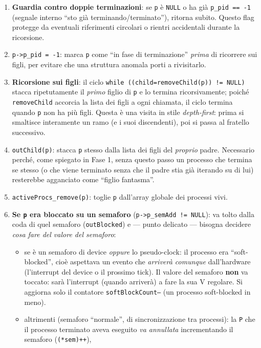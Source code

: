 \documentclass[11pt,a4paper]{article}
\newcommand{\code}[1]{\texttt{#1}}
\begin{document}
\begin{enumerate}
\item \textbf{Guardia contro doppie terminazioni}: se \code{p} è
  \code{NULL} o ha già \code{p\_pid == -1} (segnale interno ``sto già
  terminando/terminato''), ritorna subito. Questo flag protegge da eventuali
  riferimenti circolari o rientri accidentali durante la ricorsione.
\item \code{p->p\_pid = -1}: marca \code{p} come ``in fase di
  terminazione'' \emph{prima} di ricorrere sui figli, per evitare che una
  struttura anomala porti a rivisitarlo.
\item \textbf{Ricorsione sui figli}: il ciclo \code{while
  ((child=removeChild(p)) != NULL)} stacca ripetutamente il \emph{primo}
  figlio di \code{p} e lo termina ricorsivamente; poiché \code{removeChild}
  accorcia la lista dei figli a ogni chiamata, il ciclo termina quando
  \code{p} non ha più figli. Questa è una visita in stile
  \emph{depth-first}: prima si smaltisce interamente un ramo (e i suoi
  discendenti), poi si passa al fratello successivo.
\item \code{outChild(p)}: stacca \code{p} stesso dalla lista dei figli del
  \emph{proprio} padre. Necessario perché, come spiegato in Fase 1, senza
  questo passo un processo che termina se stesso (o che viene terminato
  senza che il padre stia già iterando su di lui) resterebbe agganciato come
  ``figlio fantasma''.
\item \code{activeProcs\_remove(p)}: toglie \code{p} dall'array globale dei
  processi vivi.
\item \textbf{Se \code{p} era bloccato su un semaforo}
  (\code{p->p\_semAdd != NULL}): va tolto dalla coda di quel semaforo
  (\code{outBlocked}) e --- punto delicato --- bisogna decidere \emph{cosa
  fare del valore del semaforo}:
  \begin{itemize}
  \item se è un semaforo di device \emph{oppure} lo pseudo-clock: il
    processo era ``soft-blocked'', cioè aspettava un evento che
    \emph{arriverà comunque} dall'hardware (l'interrupt del device o il
    prossimo tick). Il valore del semaforo \textbf{non} va toccato: sarà
    l'interrupt (quando arriverà) a fare la sua V regolare. Si aggiorna
    solo il contatore \code{softBlockCount--} (un processo soft-blocked in
    meno).
  \item altrimenti (semaforo ``normale'', di sincronizzazione tra
    processi): la \code{P} che il processo terminato aveva eseguito
    \emph{va annullata} incrementando il semaforo (\code{(*sem)++}),

\end{itemize}
\end{enumerate}
\end{document}
